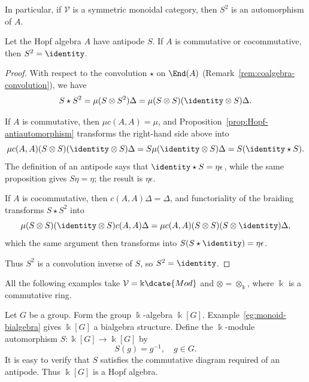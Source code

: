 In particular, if $\mathcal{V}$ is a symmetric monoidal category, then $S^2$
is an automorphism of $A$.

\begin{corollary}\label{prop:Hopf-involution}
	Let the Hopf algebra $A$ have antipode $S$. If $A$ is commutative or
	cocommutative, then $S^2=\identity$.
\end{corollary}

\begin{proof}
	With respect to the convolution $\star$ on $\End(A)$
	(Remark~\ref{rem:coalgebra-convolution}), we have
	\[ S \star S^2 = \mu (S \otimes S^2) \Delta = \mu (S \otimes S)(\identity \otimes S) \Delta. \]

	If $A$ is commutative, then $\mu c(A,A)=\mu$, and
	Proposition~\ref{prop:Hopf-antiautomorphism} transforms the right-hand side
	above into
	\[ \mu c(A, A) (S \otimes S) (\identity \otimes S)\Delta = S\mu (\identity \otimes S)\Delta = S(\identity \star S). \]
	The definition of an antipode says that
	$\identity\star S=\eta\epsilon$, while the same proposition gives
	$S\eta=\eta$; the result is $\eta\epsilon$.

	If $A$ is cocommutative, then $c(A,A)\Delta=\Delta$, and functoriality of
	the braiding transforms $S\star S^2$ into
	\[ \mu (S \otimes S)(\identity \otimes S) c(A, A) \Delta = \mu c(A, A) (S \otimes S)(S \otimes \identity)\Delta, \]
	which the same argument then transforms into
	$S(S\star\identity)=\eta\epsilon$.

	Thus $S^2$ is a convolution inverse of $S$, so $S^2=\identity$.
\end{proof}

All the following examples take $\mathcal{V}=\Bbbk\dcate{Mod}$ and
$\otimes=\otimes_{\Bbbk}$, where $\Bbbk$ is a commutative ring.

\begin{example}\label{eg:group-Hopf-algebra}
	Let $G$ be a group. Form the group $\Bbbk$-algebra $\Bbbk[G]$.
	Example~\ref{eg:monoid-bialgebra} gives $\Bbbk[G]$ a bialgebra structure.
	Define the $\Bbbk$-module automorphism $S:\Bbbk[G]\to\Bbbk[G]$ by
	\[ S(g) = g^{-1}, \quad g \in G. \]
	It is easy to verify that $S$ satisfies the commutative diagram required
	of an antipode. Thus $\Bbbk[G]$ is a Hopf algebra.
\end{example}

